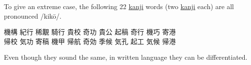 To give an extreme case, the following 22 \hyperref[sec:Kanji]{kanji} words
(two \hyperref[sec:Kanji]{kanji} each) are all pronounced /kikō/.

\begin{center}
{機構} {紀行} {稀覯} {騎行} {貴校} {奇功} {貴公} {起稿} {奇行} {機巧} {寄港}\\
{帰校} {気功} {寄稿} {機甲} {帰航} {奇効} {季候} {気孔} {起工} {気候} {帰港}
\end{center}

Even though they sound the same, in written language they can be
differentiated.


